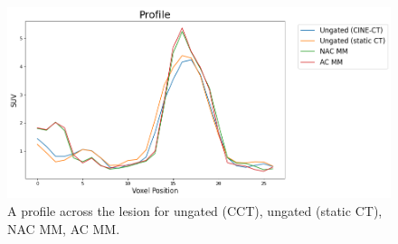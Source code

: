            \begin{figure}
                \centering
                
                \includegraphics[width=1.0\linewidth]{figures/motion_correction_1_results_2_profile.png}
                
                \captionsetup{singlelinecheck=false}
                \caption{
                    A profile across the lesion for ungated (\gls{CCT}), ungated (static \gls{CT}), \gls{NAC} \gls{MM}, \gls{AC} \gls{MM}.
                }
                \label{fig:pet_ct_respiratory_motion_correction_with_a_single_attenuation_map_using_nac_derived_deformation_fields_results_profile}
            \end{figure}
            
